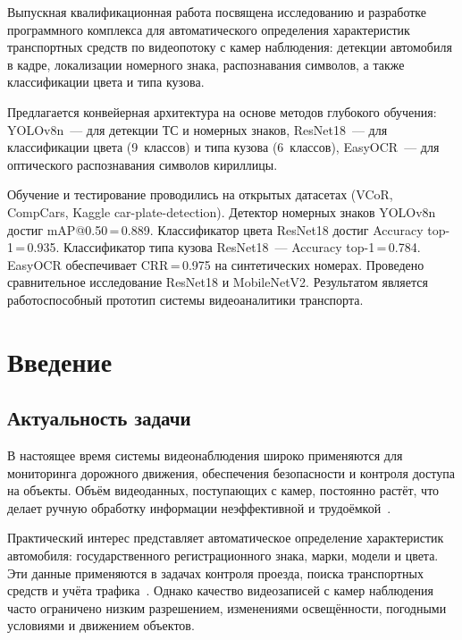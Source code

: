 \documentclass[14pt,a4paper]{report}
\numberwithin{equation}{chapter}
\numberwithin{figure}{chapter}
\numberwithin{table}{chapter}
\begin{document}
Выпускная квалификационная работа посвящена исследованию и разработке программного
комплекса для автоматического определения характеристик транспортных средств по
видеопотоку с камер наблюдения: детекции автомобиля в кадре, локализации
номерного знака, распознавания символов, а также классификации цвета и типа кузова.

Предлагается конвейерная архитектура на основе методов глубокого обучения:
YOLOv8n~--- для детекции ТС и номерных знаков, ResNet18~--- для классификации
цвета (9~классов) и типа кузова (6~классов), EasyOCR~--- для оптического
распознавания символов кириллицы.

Обучение и тестирование проводились на открытых датасетах (VCoR, CompCars,
Kaggle car-plate-detection). Детектор номерных знаков YOLOv8n достиг
mAP@0.50\,=\,0.889. Классификатор цвета ResNet18 достиг Accuracy
top-1\,=\,0.935. Классификатор типа кузова ResNet18~--- Accuracy
top-1\,=\,0.784. EasyOCR обеспечивает CRR\,=\,0.975 на синтетических
номерах. Проведено сравнительное исследование ResNet18 и MobileNetV2.
Результатом является работоспособный прототип системы видеоаналитики транспорта.

\tableofcontents

\chapter{Введение}

\section{Актуальность задачи}

В настоящее время системы видеонаблюдения широко применяются для мониторинга
дорожного движения, обеспечения безопасности и контроля доступа на объекты.
Объём видеоданных, поступающих с камер, постоянно растёт, что делает ручную
обработку информации неэффективной и трудоёмкой~\cite{abramov2019}.

Практический интерес представляет автоматическое определение характеристик
автомобиля: государственного регистрационного знака, марки, модели и цвета.
Эти данные применяются в задачах контроля проезда, поиска транспортных средств
и учёта трафика~\cite{survey2021}. Однако качество видеозаписей с камер
наблюдения часто ограничено низким разрешением, изменениями освещённости,
погодными условиями и движением объектов.
\end{document}
